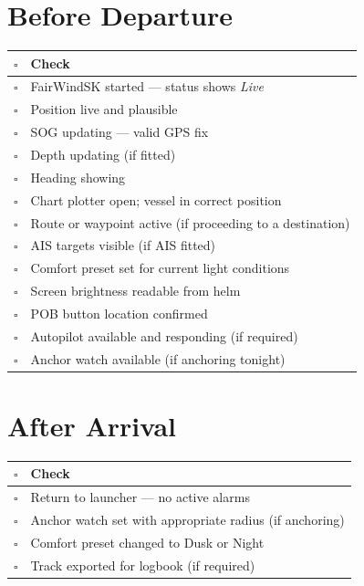 \section*{Before Departure}

\begin{longtable}{C{0.8cm}L{12.9cm}}
\toprule
{}
\color{white}\sffamily\bfseries $\square$ &
\color{white}\sffamily\bfseries Check \\
\midrule
$\square$ & FairWindSK started --- status shows \textit{Live} \\
$\square$ & Position live and plausible \\
$\square$ & SOG updating --- valid GPS fix \\
$\square$ & Depth updating (if fitted) \\
$\square$ & Heading showing \\
$\square$ & Chart plotter open; vessel in correct position \\
$\square$ & Route or waypoint active (if proceeding to a destination) \\
$\square$ & AIS targets visible (if AIS fitted) \\
$\square$ & Comfort preset set for current light conditions \\
$\square$ & Screen brightness readable from helm \\
$\square$ & POB button location confirmed \\
$\square$ & Autopilot available and responding (if required) \\
$\square$ & Anchor watch available (if anchoring tonight) \\
\bottomrule
\end{longtable}

\section*{After Arrival}

\begin{longtable}{C{0.8cm}L{12.9cm}}
\toprule
{}
\color{white}\sffamily\bfseries $\square$ &
\color{white}\sffamily\bfseries Check \\
\midrule
$\square$ & Return to launcher --- no active alarms \\
$\square$ & Anchor watch set with appropriate radius (if anchoring) \\
$\square$ & Comfort preset changed to Dusk or Night \\
$\square$ & Track exported for logbook (if required) \\
\bottomrule
\end{longtable}


